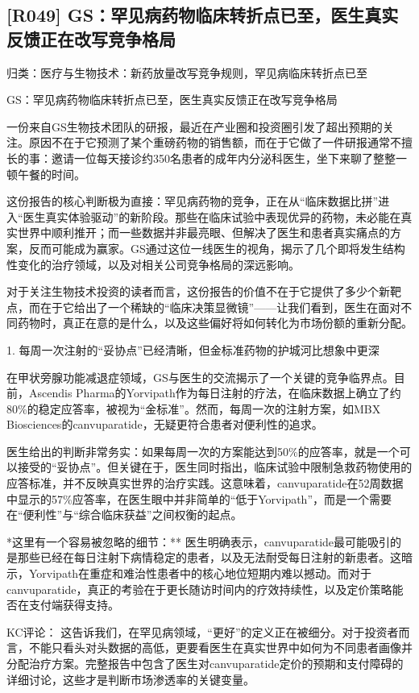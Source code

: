 \documentclass[11pt]{ctexart}
\begin{document}
\subsection{[R049] GS：罕见病药物临床转折点已至，医生真实反馈正在改写竞争格局}
{\small\color{refgray}归类：医疗与生物技术：新药放量改写竞争规则，罕见病临床转折点已至}

GS：罕见病药物临床转折点已至，医生真实反馈正在改写竞争格局

一份来自GS生物技术团队的研报，最近在产业圈和投资圈引发了超出预期的关注。原因不在于它预测了某个重磅药物的销售额，而在于它做了一件研报通常不擅长的事：邀请一位每天接诊约350名患者的成年内分泌科医生，坐下来聊了整整一顿午餐的时间。

这份报告的核心判断极为直接：罕见病药物的竞争，正在从“临床数据比拼”进入“医生真实体验驱动”的新阶段。那些在临床试验中表现优异的药物，未必能在真实世界中顺利推开；而一些数据并非最亮眼、但解决了医生和患者真实痛点的方案，反而可能成为赢家。GS通过这位一线医生的视角，揭示了几个即将发生结构性变化的治疗领域，以及对相关公司竞争格局的深远影响。

对于关注生物技术投资的读者而言，这份报告的价值不在于它提供了多少个新靶点，而在于它给出了一个稀缺的“临床决策显微镜”——让我们看到，医生在面对不同药物时，真正在意的是什么，以及这些偏好将如何转化为市场份额的重新分配。

1. 每周一次注射的“妥协点”已经清晰，但金标准药物的护城河比想象中更深

在甲状旁腺功能减退症领域，GS与医生的交流揭示了一个关键的竞争临界点。目前，Ascendis Pharma的Yorvipath作为每日注射的疗法，在临床数据上确立了约80\%的稳定应答率，被视为“金标准”。然而，每周一次的注射方案，如MBX Biosciences的canvuparatide，无疑更符合患者对便利性的追求。

医生给出的判断非常务实：如果每周一次的方案能达到50\%的应答率，就是一个可以接受的“妥协点”。但关键在于，医生同时指出，临床试验中限制急救药物使用的应答标准，并不反映真实世界的治疗实践。这意味着，canvuparatide在52周数据中显示的57\%应答率，在医生眼中并非简单的“低于Yorvipath”，而是一个需要在“便利性”与“综合临床获益”之间权衡的起点。

*这里有一个容易被忽略的细节：** 医生明确表示，canvuparatide最可能吸引的是那些已经在每日注射下病情稳定的患者，以及无法耐受每日注射的新患者。这暗示，Yorvipath在重症和难治性患者中的核心地位短期内难以撼动。而对于canvuparatide，真正的考验在于更长随访时间内的疗效持续性，以及定价策略能否在支付端获得支持。

KC评论： 这告诉我们，在罕见病领域，“更好”的定义正在被细分。对于投资者而言，不能只看头对头数据的高低，更要看医生在真实世界中如何为不同患者画像并分配治疗方案。完整报告中包含了医生对canvuparatide定价的预期和支付障碍的详细讨论，这些才是判断市场渗透率的关键变量。
\end{document}
